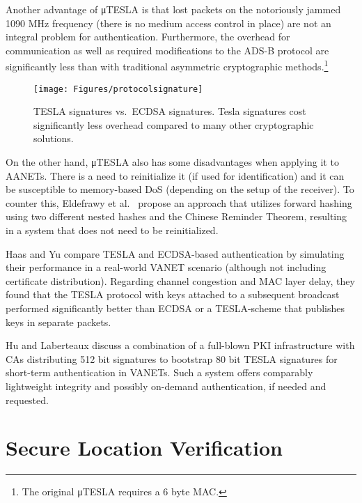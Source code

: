 \documentclass[english]{IEEEtran}
\begin{document}
Another advantage of μTESLA is that lost packets on the notoriously
jammed 1090 MHz frequency (there is no medium access control in place)
are not an integral problem for authentication. Furthermore, the overhead
for communication as well as required modifications to the ADS-B protocol
are significantly less than with traditional asymmetric cryptographic
methods.\footnote{ The original μTESLA requires a 6 byte MAC.}

\begin{figure}
\texttt{[image: Figures/protocolsignature]}

\caption{TESLA signatures vs.~ECDSA signatures. Tesla signatures cost significantly
less overhead compared to many other cryptographic solutions. \label{fig:TESLA-signatures-vs.}}


\end{figure}


On the other hand, μTESLA also has some disadvantages when applying
it to AANETs.\emph{ }There is a need to reinitialize it (if used for
identification) and it can be susceptible to memory-based DoS (depending
on the setup of the receiver).\emph{ }To counter this, Eldefrawy et
al.~\cite{Eldefrawy2010}\emph{ }propose an approach that utilizes
forward hashing using two different nested hashes and the Chinese
Reminder Theorem,\emph{ }resulting in a system that does not need
to be reinitialized. 

Haas and Yu \cite{Haas2009} compare TESLA and ECDSA-based authentication
by simulating their performance in a real-world VANET scenario (although
not including certificate distribution). Regarding channel congestion
and MAC layer delay, they found that the TESLA protocol with keys
attached to a subsequent broadcast performed significantly better
than ECDSA or a TESLA-scheme that publishes keys in separate packets.

Hu and Laberteaux \cite{Hu2006} discuss a combination of a full-blown
PKI infrastructure with CAs distributing 512 bit signatures to bootstrap
80 bit TESLA signatures for short-term authentication in VANETs. Such
a system offers comparably lightweight integrity and possibly on-demand
authentication, if needed and requested. \\



\section{Secure Location Verification \label{sec:Secure-Location-Verification}}
\end{document}
